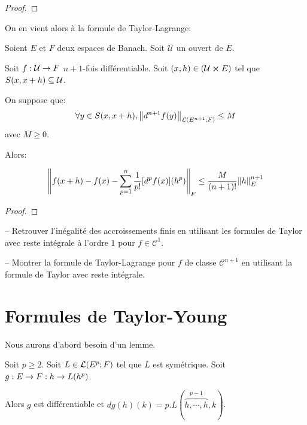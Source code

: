 \ifdefined\outputproof
\begin{proof}

\end{proof}
\fi

On en vient alors à la formule de Taylor-Lagrange:

\begin{theorem} 
	\label{theorem:taylor_lagrange_formula}
	Soient $E$ et $F$ deux espaces de Banach. Soit $\mathcal{U}$ un ouvert de
	$E$.

	Soit $f : \mathcal{U} \rightarrow F$ $n + 1$-fois différentiable.
	Soit $(x, h) \in (\mathcal{U} \cross E)$ tel que $S(x, x + h)
	\subseteq \mathcal{U}$.

	On suppose que:
	\begin{equation*}
		\forall y \in S(x, x + h), \norm{d^{n +
		1}f(y)}_{\mathcal{L}(E^{n + 1}; F)} \leq M
	\end{equation*}
	avec $M \geq 0$.

	Alors:

	\begin{equation*}
		\norm{f(x + h) - f(x) - \displaystyle \sum_{p = 1}^{n}
		\frac{1}{p!} [d^{p}f(x)](h^{p})}_{F} \leq \frac{M}{(n + 1)!}
		\norm{h}_{E}^{n + 1}
	\end{equation*}
\end{theorem}

\ifdefined\outputproof
\begin{proof}

\end{proof}
\fi

\begin{exercice}
	-- Retrouver l'inégalité des accroissements finis en utilisant les formules
	de Taylor avec reste intégrale à l'ordre $1$ pour $f \in \mathcal{C}^{1}$.

	-- Montrer la formule de Taylor-Lagrange pour $f$ de classe $\mathcal{C}^{n
	+ 1}$ en utilisant la formule de Taylor avec reste intégrale.
\end{exercice}

\section{Formules de Taylor-Young}

Nous aurons d'abord besoin d'un lemme.

\begin{lemma}
	Soit $p \geq 2$. Soit $L \in \mathcal{L}(E^{p}; F)$ tel que $L$ est
	symétrique.
	Soit $g : E \rightarrow F : h \rightarrow L(h^{p})$.

	Alors $g$ est différentiable et $dg(h)(k) = p.L(\overbrace{h,
	\cdots, h}^{p - 1}, k)$.
\end{lemma}

